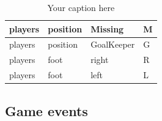 \documentclass{Configuration_Files/PoliMi3i_thesis}
\begin{document}
\begin{table}[ht]
\begin{tabular}{|l|l|l|l|}
		players                   & position           & Missing            & M                  \\ \hline
		players                   & position           & GoalKeeper         & G                  \\ \hline
		players                   & foot               & right              & R                  \\ \hline
		players                   & foot               & left               & L                  \\ \hline
	\end{tabular}
	\caption{Your caption here}
	\label{your-label-here}
\end{table}
\newpage
\subsection{Game events}
\end{document}
